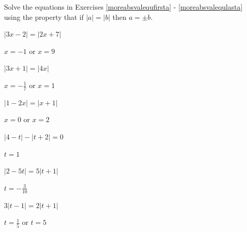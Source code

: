 \documentclass{ximera}
\begin{document}
\begin{question}
Solve the equations in Exercises \ref{moreabsvalequfirsta} - \ref{moreabsvalequlasta} using  the property that if $|a| = |b|$ then  $a = \pm b$. 


\begin{problem}\label{moreabsvalequfirsta}
$|3x - 2| = |2x + 7|$ 

\begin{solution}
$x = -1$ or $x = 9$
\end{solution}
\end{problem}

\begin{problem}
$|3x+1| = |4x|$

\begin{solution}
$x = -\frac{1}{7}$ or $x = 1$
\end{solution}
\end{problem}

\begin{problem}
$|1-2x| = |x+1|$

\begin{solution}
$x = 0$ or $x = 2$
\end{solution}
\end{problem}

\begin{problem}
$|4-t| - |t+2| = 0$

\begin{solution}
$t=1$
\end{solution}
\end{problem}

\begin{problem}
$|2-5t| = 5 |t+1|$

\begin{solution}
$t = -\frac{3}{10}$
\end{solution}
\end{problem}

\begin{problem}\label{moreabsvalequlasta}
$3|t-1| = 2|t+1|$

\begin{solution}
$t = \frac{1}{5}$ or $t = 5$
\end{solution}
\end{problem}

\end{question}
\end{document}
